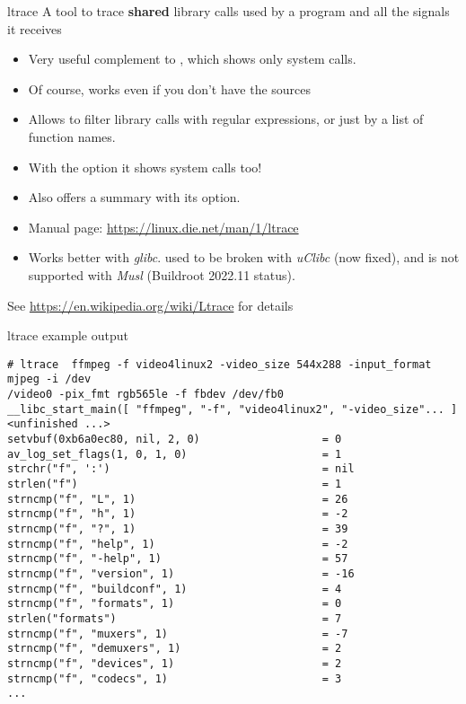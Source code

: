 \begin{frame}{ltrace}
  A tool to trace {\bf shared} library calls used by a program and all the signals
  it receives
  \begin{itemize}
  \item Very useful complement to , which shows only system
    calls.
  \item Of course, works even if you don't have the sources
  \item Allows to filter library calls with regular expressions, or
    just by a list of function names.
  \item With the  option it shows system calls too!
  \item Also offers a summary with its  option.
  \item Manual page: \url{https://linux.die.net/man/1/ltrace}
  \item Works better with {\em glibc}.  used to be broken
        with {\em uClibc} (now fixed), and is not supported
        with {\em Musl} (Buildroot 2022.11 status).
  \end{itemize}
  See \url{https://en.wikipedia.org/wiki/Ltrace} for details
\end{frame}

\begin{frame}[fragile]{ltrace example output}
  \scriptsize
  \begin{block}{}
\begin{verbatim}
# ltrace  ffmpeg -f video4linux2 -video_size 544x288 -input_format mjpeg -i /dev
/video0 -pix_fmt rgb565le -f fbdev /dev/fb0
__libc_start_main([ "ffmpeg", "-f", "video4linux2", "-video_size"... ] <unfinished ...>
setvbuf(0xb6a0ec80, nil, 2, 0)                   = 0
av_log_set_flags(1, 0, 1, 0)                     = 1
strchr("f", ':')                                 = nil
strlen("f")                                      = 1
strncmp("f", "L", 1)                             = 26
strncmp("f", "h", 1)                             = -2
strncmp("f", "?", 1)                             = 39
strncmp("f", "help", 1)                          = -2
strncmp("f", "-help", 1)                         = 57
strncmp("f", "version", 1)                       = -16
strncmp("f", "buildconf", 1)                     = 4
strncmp("f", "formats", 1)                       = 0
strlen("formats")                                = 7
strncmp("f", "muxers", 1)                        = -7
strncmp("f", "demuxers", 1)                      = 2
strncmp("f", "devices", 1)                       = 2
strncmp("f", "codecs", 1)                        = 3
...
\end{verbatim}
\end{block}
\end{frame}


